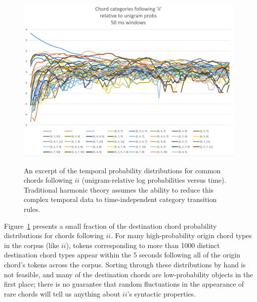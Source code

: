 \begin{figure}
	\centering
	\caption{An excerpt of the temporal probability distributions for common chords following $ii$ (unigram-relative log probabilities versus time).  Traditional harmonic theory assumes the ability to reduce this complex temporal data to time-independent category transition rules.}
	\includegraphics[width=6in]{ii_messy.png}
	\label{ii_messy}
\end{figure}

Figure~\ref{ii_messy} presents a small fraction of the destination chord probability distributions for chords following $ii$.  For many high-probability origin chord types in the corpus (like $ii$), tokens corresponding to more than 1000 distinct destination chord types appear within the 5 seconds following all of the origin chord's tokens across the corpus.  Sorting through these distributions by hand is not feasible, and many of the destination chords are low-probability objects in the first place; there is no guarantee that random fluctuations in the appearance of rare chords will tell us anything about $ii$'s syntactic properties.


